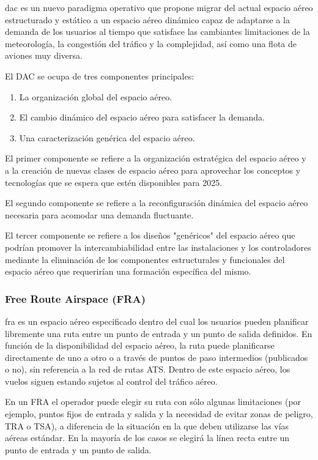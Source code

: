 \acrfull{dac} es un nuevo paradigma operativo que propone migrar del actual espacio aéreo estructurado y estático a un espacio aéreo dinámico capaz de adaptarse a la demanda de los usuarios al tiempo que satisface las cambiantes limitaciones de la meteorología, la congestión del tráfico y la complejidad, así como una flota de aviones muy diversa.

El DAC se ocupa de tres componentes principales: 

\begin{enumerate}
    \item La organización global del espacio aéreo.
    \item El cambio dinámico del espacio aéreo para satisfacer la demanda.
    \item Una caracterización genérica del espacio aéreo.
\end{enumerate}

El primer componente se refiere a la organización estratégica del espacio aéreo y a la creación de nuevas clases de espacio aéreo para aprovechar los conceptos y tecnologías que se espera que estén disponibles para 2025. 

El segundo componente se refiere a la reconfiguración dinámica del espacio aéreo necesaria para acomodar una demanda fluctuante. 

El tercer componente se refiere a los diseños "genéricos" del espacio aéreo que podrían promover la intercambiabilidad entre las instalaciones y los controladores mediante la eliminación de los componentes estructurales y funcionales del espacio aéreo que requerirían una formación específica del mismo.

\subsubsection{Free Route Airspace (FRA)}

\acrfull{fra} es un espacio aéreo especificado dentro del cual los usuarios pueden planificar libremente una ruta entre un punto de entrada y un punto de salida definidos. En función de la disponibilidad del espacio aéreo, la ruta puede planificarse directamente de uno a otro o a través de puntos de paso intermedios (publicados o no), sin referencia a la red de rutas ATS. Dentro de este espacio aéreo, los vuelos siguen estando sujetos al control del tráfico aéreo.

En un FRA el operador puede elegir su ruta con sólo algunas limitaciones (por ejemplo, puntos fijos de entrada y salida y la necesidad de evitar zonas de peligro, TRA o TSA), a diferencia de la situación en la que deben utilizarse las vías aéreas estándar. En la mayoría de los casos se elegirá la línea recta entre un punto de entrada y un punto de salida. 

